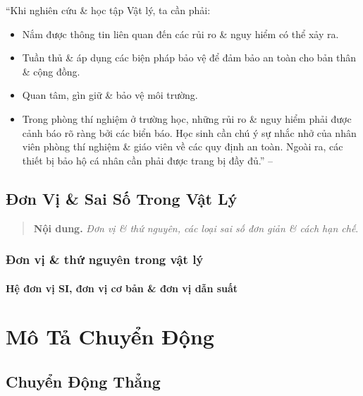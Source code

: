 \documentclass[oneside]{book}
\numberwithin{equation}{section}
\begin{document}
``Khi nghiên cứu \& học tập Vật lý, ta cần phải:
\begin{itemize}
	\item Nắm được thông tin liên quan đến các rủi ro \& nguy hiểm có thể xảy ra.
	\item Tuần thủ \& áp dụng các biện pháp bảo vệ để đảm bảo an toàn cho bản thân \& cộng đồng.
	\item Quan tâm, gìn giữ \& bảo vệ môi trường.
	\item Trong phòng thí nghiệm ở trường học, những rủi ro \& nguy hiểm phải được cảnh báo rõ ràng bởi các biển báo. Học sinh cần chú ý sự nhắc nhở của nhân viên phòng thí nghiệm \& giáo viên về các quy định an toàn. Ngoài ra, các thiết bị bảo hộ cá nhân cần phải được trang bị đầy đủ.'' -- \cite[p. 14]{SGK_Vat_Ly_10_Chan_Troi_Sang_Tao}
\end{itemize}


\section{Đơn Vị \& Sai Số Trong Vật Lý}

\begin{quotation}
	\textbf{Nội dung.} \textit{Đơn vị \& thứ nguyên, các loại sai số đơn giản \& cách hạn chế}.
\end{quotation}

\subsection{Đơn vị \& thứ nguyên trong vật lý}

\subsubsection{Hệ đơn vị SI, đơn vị cơ bản \& đơn vị dẫn suất}


\chapter{Mô Tả Chuyển Động}

\section{Chuyển Động Thẳng}
\end{document}

